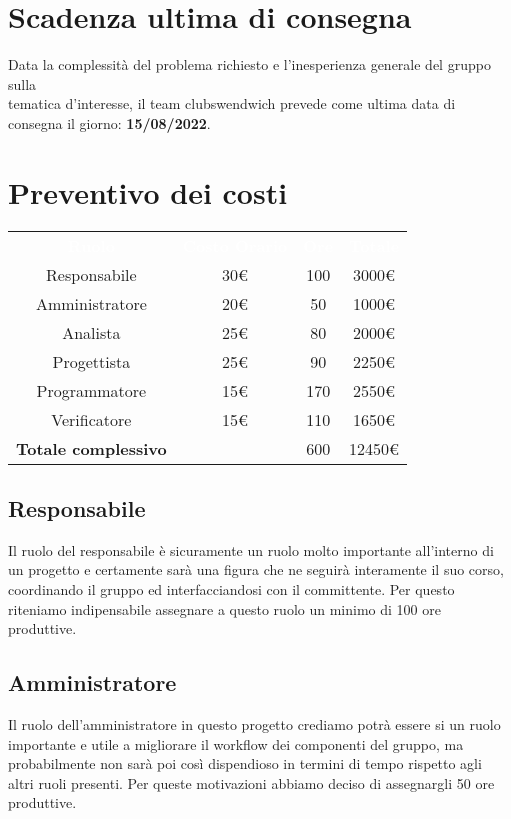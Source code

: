 \section{Scadenza ultima di consegna}
Data la complessità del problema richiesto e l'inesperienza generale del gruppo sulla \\
tematica d'interesse, il team clubswendwich prevede come ultima data di consegna 
il giorno: \textbf{15/08/2022}.

\section{Preventivo dei costi}
{\renewcommand{\arraystretch}{1.5}
\begin{tabular}{cccc}
	\rowcolor[RGB]{33, 73, 50}
	\textcolor{white}{\textbf{Ruolo}} & \textcolor{white}{\textbf{Costo Orario}} 
    & \textcolor{white}{\textbf{Ore}} & \textcolor{white}{\textbf{Totale}}\\
	\rowcolor[RGB]{216, 235, 171}
	Responsabile & 30€ & 100 & 3000€     			\\
	\rowcolor[RGB]{233, 245, 206}
	Amministratore & 20€ & 50 & 1000€    			\\
    \rowcolor[RGB]{216, 235, 171}
	Analista & 25€ & 80 & 2000€          			\\
	\rowcolor[RGB]{233, 245, 206}
	Progettista & 25€ & 90 & 2250€       			\\
    \rowcolor[RGB]{216, 235, 171}
	Programmatore & 15€ & 170 & 2550€     			\\
	\rowcolor[RGB]{233, 245, 206}
	Verificatore & 15€ & 110 & 1650€      			\\
	\rowcolor[RGB]{216, 235, 171}
	\textbf{Totale complessivo} & & 600 & 12450€    \\
\end{tabular}	
}

\subsection{Responsabile}
Il ruolo del responsabile è sicuramente un ruolo molto importante all'interno di un progetto e certamente sarà una figura che ne
seguirà interamente il suo corso, coordinando il gruppo ed interfacciandosi con il committente.
Per questo riteniamo indipensabile assegnare a questo ruolo un minimo di 100 ore produttive. 

\subsection{Amministratore}
Il ruolo dell'amministratore in questo progetto crediamo potrà essere si un ruolo importante e utile a migliorare il workflow dei componenti del gruppo, ma probabilmente non sarà poi così dispendioso
in termini di tempo rispetto agli altri ruoli presenti. Per queste motivazioni abbiamo deciso di assegnargli 50 ore produttive.

